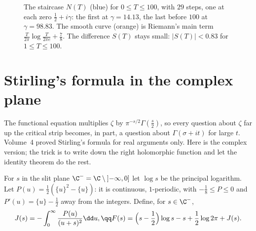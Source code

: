 \begin{figure}[ht]
\centering
{}
\caption{The staircase $N(T)$ (blue) for $0\le T\le100$, with $29$ steps, one at each zero $\frac12+i\gamma$: the first at $\gamma=14.13$, the last before $100$ at $\gamma=98.83$. The smooth
curve (orange) is Riemann's main term $\frac T{2\pi}\log\frac T{2\pi e}+\frac78$. The difference $S(T)$ stays small: $|S(T)|<0.83$ for $1\le T\le100$.}
\label{fig:nt}
\end{figure}

\section{Stirling's formula in the complex plane}

The functional equation multiplies $\zeta$ by $\pi^{-s/2}\Gamma(\frac s2)$, so every question about $\zeta$ far up the critical strip becomes, in part, a question about
$\Gamma(\sigma+it)$ for large $t$. Volume~4 proved Stirling's formula for real arguments only. Here is the complex version; the trick is to write down the right
holomorphic function and let the identity theorem do the rest.

For $s$ in the slit plane $\C^-=\C\setminus\left]-\infty,0\right]$ let $\log s$ be the principal logarithm. Let $P(u)=\frac12(\{u\}^2-\{u\})$: it is continuous, $1$-periodic, with
$-\frac18\le P\le0$ and $P'(u)=\{u\}-\frac12$ away from the integers. Define, for $s\in\C^-$,
\[
\begin{gathered}J(s)=-\int_0^\infty\frac{P(u)}{(u+s)^2}\dd u,\qq F(s)=\Bigl(s-\frac12\Bigr)\log s-s+\frac12\log2\pi+J(s).\end{gathered}
\]

